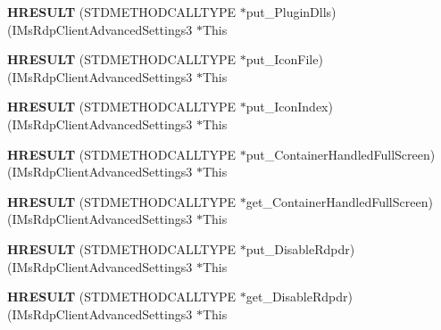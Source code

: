 \begin{DoxyCompactItemize}
{\bfseries H\+R\+E\+S\+U\+LT} (S\+T\+D\+M\+E\+T\+H\+O\+D\+C\+A\+L\+L\+T\+Y\+PE $\ast$put\+\_\+\+Plugin\+Dlls)(I\+Ms\+Rdp\+Client\+Advanced\+Settings3 $\ast$This
\item 
\mbox{\label{struct_i_ms_rdp_client_advanced_settings3_vtbl_a16bf287ca85679e081b1d2fb1dedb1c6}} 
{\bfseries H\+R\+E\+S\+U\+LT} (S\+T\+D\+M\+E\+T\+H\+O\+D\+C\+A\+L\+L\+T\+Y\+PE $\ast$put\+\_\+\+Icon\+File)(I\+Ms\+Rdp\+Client\+Advanced\+Settings3 $\ast$This
\item 
\mbox{\label{struct_i_ms_rdp_client_advanced_settings3_vtbl_a6606084a689afbdfa6d6dfbb84b5f51d}} 
{\bfseries H\+R\+E\+S\+U\+LT} (S\+T\+D\+M\+E\+T\+H\+O\+D\+C\+A\+L\+L\+T\+Y\+PE $\ast$put\+\_\+\+Icon\+Index)(I\+Ms\+Rdp\+Client\+Advanced\+Settings3 $\ast$This
\item 
\mbox{\label{struct_i_ms_rdp_client_advanced_settings3_vtbl_abe61b92a558ec2362c1532d17a8d0702}} 
{\bfseries H\+R\+E\+S\+U\+LT} (S\+T\+D\+M\+E\+T\+H\+O\+D\+C\+A\+L\+L\+T\+Y\+PE $\ast$put\+\_\+\+Container\+Handled\+Full\+Screen)(I\+Ms\+Rdp\+Client\+Advanced\+Settings3 $\ast$This
\item 
\mbox{\label{struct_i_ms_rdp_client_advanced_settings3_vtbl_a2b115db49229fe76ecd20b9aa827aaa0}} 
{\bfseries H\+R\+E\+S\+U\+LT} (S\+T\+D\+M\+E\+T\+H\+O\+D\+C\+A\+L\+L\+T\+Y\+PE $\ast$get\+\_\+\+Container\+Handled\+Full\+Screen)(I\+Ms\+Rdp\+Client\+Advanced\+Settings3 $\ast$This
\item 
\mbox{\label{struct_i_ms_rdp_client_advanced_settings3_vtbl_a94514a92d781adc8d363081b34cb26d3}} 
{\bfseries H\+R\+E\+S\+U\+LT} (S\+T\+D\+M\+E\+T\+H\+O\+D\+C\+A\+L\+L\+T\+Y\+PE $\ast$put\+\_\+\+Disable\+Rdpdr)(I\+Ms\+Rdp\+Client\+Advanced\+Settings3 $\ast$This
\item 
\mbox{\label{struct_i_ms_rdp_client_advanced_settings3_vtbl_ad8c5c82f0ab94993134ab05092c13e28}} 
{\bfseries H\+R\+E\+S\+U\+LT} (S\+T\+D\+M\+E\+T\+H\+O\+D\+C\+A\+L\+L\+T\+Y\+PE $\ast$get\+\_\+\+Disable\+Rdpdr)(I\+Ms\+Rdp\+Client\+Advanced\+Settings3 $\ast$This
\item 

\end{DoxyCompactItemize}
